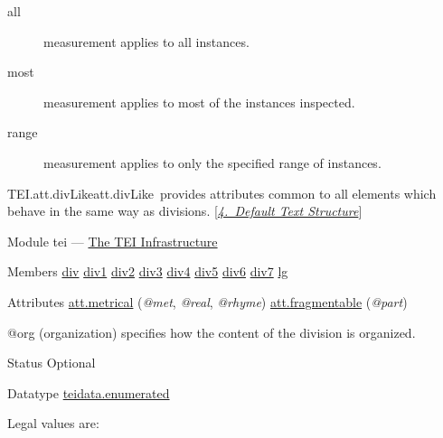 \begin{reflist}
\begin{sansreflist}
\begin{reflist}
\begin{description}
\item[{all}]measurement applies to all instances.
\item[{most}]measurement applies to most of the instances inspected.
\item[{range}]measurement applies to only the specified range of instances.
\end{description} 
\end{reflist}  
\end{sansreflist}  
\end{reflist}  
\begin{reflist}
\item[]\begin{specHead}{TEI.att.divLike}{att.divLike} provides attributes common to all elements which behave in the same way as divisions. [\textit{\hyperref[DS]{4.\ Default Text Structure}}]\end{specHead} 
    \item[{Module}]
  tei — \hyperref[ST]{The TEI Infrastructure}
    \item[{Members}]
  \hyperref[TEI.div]{div} \hyperref[TEI.div1]{div1} \hyperref[TEI.div2]{div2} \hyperref[TEI.div3]{div3} \hyperref[TEI.div4]{div4} \hyperref[TEI.div5]{div5} \hyperref[TEI.div6]{div6} \hyperref[TEI.div7]{div7} \hyperref[TEI.lg]{lg}
    \item[{Attributes}]
  \hyperref[TEI.att.metrical]{att.metrical} (\textit{@met}, \textit{@real}, \textit{@rhyme}) \hyperref[TEI.att.fragmentable]{att.fragmentable} (\textit{@part}) \hfil\\[-10pt]\begin{sansreflist}
    \item[@org]
  (organization) specifies how the content of the division is organized.
\begin{reflist}
    \item[{Status}]
  Optional
    \item[{Datatype}]
  \hyperref[TEI.teidata.enumerated]{teidata.enumerated}
    \item[{Legal values are:}]
  \begin{description}


\end{description}
\end{reflist}
\end{sansreflist}
\end{reflist}
